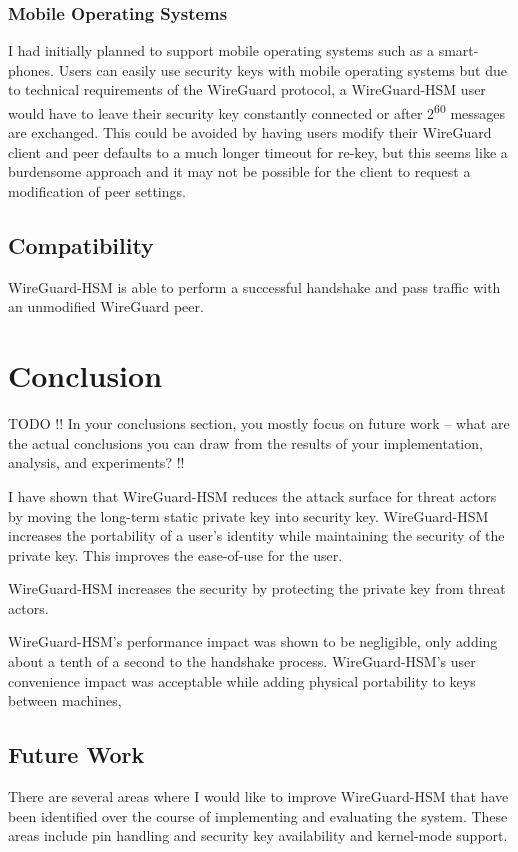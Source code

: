 \documentclass [11pt, proquest] {uwthesis}[2020/02/24]
\begin{document}
\subsection{Mobile Operating Systems}
I had initially planned to support mobile operating systems such as a smart-phones. Users can easily use security keys
with mobile operating systems but due to technical requirements of the WireGuard protocol, a WireGuard-HSM user would have to leave their security key constantly connected
or after 2\textsuperscript{60} messages are exchanged. This could be avoided by having users modify their WireGuard client and peer defaults to a much longer timeout for re-key, but this seems like a burdensome approach and it may not be possible for the client to request a modification of peer settings.


\section{Compatibility}
WireGuard-HSM is able to perform a successful handshake and pass traffic with an unmodified WireGuard peer.

\chapter {Conclusion}
 
TODO !! In your conclusions section, you mostly focus on future work -- what are the actual conclusions you can draw from the results of your implementation, analysis, and experiments? !!

I have shown that WireGuard-HSM reduces the attack surface for threat actors by moving the long-term static private key into security key. WireGuard-HSM increases the portability of a user's identity while maintaining the security of the private key. This improves the ease-of-use for the user.

WireGuard-HSM increases the security by protecting the private key from threat actors.

WireGuard-HSM's performance impact was shown to be negligible, only adding about a tenth of a second to the handshake process.
WireGuard-HSM's user convenience impact was acceptable while adding physical portability to keys between machines,

\section {Future Work}
There are several areas where I would like to improve WireGuard-HSM that have been identified over the course of implementing and evaluating the system. These areas include pin handling and security key availability and kernel-mode support.
\end{document}
